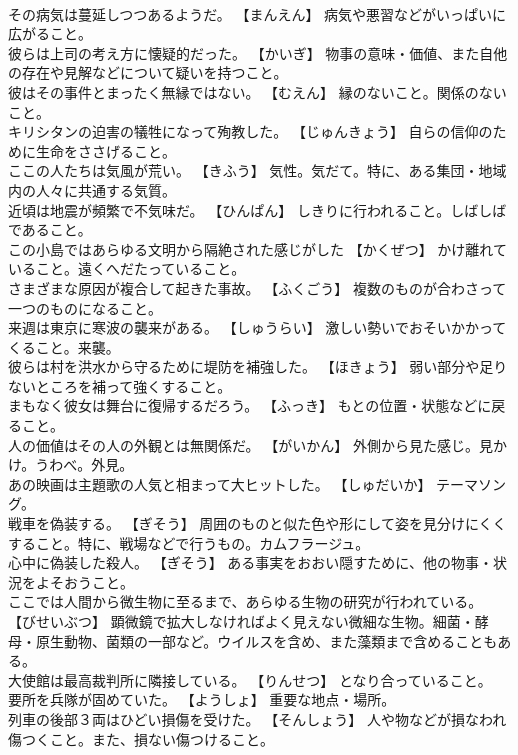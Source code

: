 \documentclass[8pt]{extreport}
\begin{document}
\begin{CJK}{UTF8}{min}
\\	その病気は蔓延しつつあるようだ。	【まんえん】 病気や悪習などがいっぱいに広がること。
\\	彼らは上司の考え方に懐疑的だった。	【かいぎ】 物事の意味・価値、また自他の存在や見解などについて疑いを持つこと。
\\	彼はその事件とまったく無縁ではない。	【むえん】 縁のないこと。関係のないこと。
\\	キリシタンの迫害の犠牲になって殉教した。	【じゅんきょう】 自らの信仰のために生命をささげること。
\\	ここの人たちは気風が荒い。	【きふう】 気性。気だて。特に、ある集団・地域内の人々に共通する気質。
\\	近頃は地震が頻繁で不気味だ。	【ひんぱん】 しきりに行われること。しばしばであること。
\\	この小島ではあらゆる文明から隔絶された感じがした	【かくぜつ】 かけ離れていること。遠くへだたっていること。
\\	さまざまな原因が複合して起きた事故。	【ふくごう】 複数のものが合わさって一つのものになること。
\\	来週は東京に寒波の襲来がある。	【しゅうらい】 激しい勢いでおそいかかってくること。来襲。
\\	彼らは村を洪水から守るために堤防を補強した。	【ほきょう】 弱い部分や足りないところを補って強くすること。
\\	まもなく彼女は舞台に復帰するだろう。	【ふっき】 もとの位置・状態などに戻ること。
\\	人の価値はその人の外観とは無関係だ。	【がいかん】 外側から見た感じ。見かけ。うわべ。外見。
\\	あの映画は主題歌の人気と相まって大ヒットした。	【しゅだいか】 テーマソング。
\\	戦車を偽装する。	【ぎそう】 周囲のものと似た色や形にして姿を見分けにくくすること。特に、戦場などで行うもの。カムフラージュ。
\\	心中に偽装した殺人。	【ぎそう】 ある事実をおおい隠すために、他の物事・状況をよそおうこと。
\\	ここでは人間から微生物に至るまで、あらゆる生物の研究が行われている。	【びせいぶつ】 顕微鏡で拡大しなければよく見えない微細な生物。細菌・酵母・原生動物、菌類の一部など。ウイルスを含め、また藻類まで含めることもある。
\\	大使館は最高裁判所に隣接している。	【りんせつ】 となり合っていること。
\\	要所を兵隊が固めていた。	【ようしょ】 重要な地点・場所。
\\	列車の後部３両はひどい損傷を受けた。	【そんしょう】 人や物などが損なわれ傷つくこと。また、損ない傷つけること。

\end{CJK}
\end{document}
